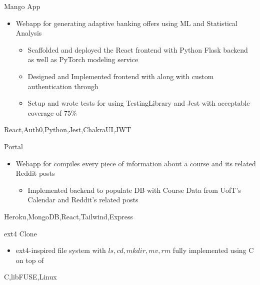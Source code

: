 %
%
%


\begin{projects}
	\project
	{Mango App}{ }
	{}
	{\begin{itemize}
        \setlength\itemsep{0.2em}
        \item{Webapp for generating adaptive banking offers using ML and Statistical Analysis}
        \begin{itemize}
            \setlength\itemsep{0.2em}
            \item{Scaffolded and deployed the React frontend with Python Flask backend as well as PyTorch modeling service}
            \item{Designed and Implemented frontend with  along with custom authentication through }
            \item{Setup and wrote tests for using TestingLibrary and Jest with acceptable coverage of 75\%}
        \end{itemize}   
      \end{itemize}
    }
	{React,Auth0,Python,Jest,ChakraUI,JWT}

	\project
	{Portal}{ }
	{ }
	{\begin{itemize}
        \setlength\itemsep{0.2em}
        \item{Webapp for compiles every piece of information about a course and its related Reddit posts}
        \begin{itemize}
            \item{Implemented backend to populate DB with Course Data from UofT's Calendar and Reddit's related posts}
        \end{itemize}   
      \end{itemize}
    }
    {Heroku,MongoDB,React,Tailwind,Express}

    \project
	{ext4 Clone}{ }
	{}
	{\begin{itemize}
        \item{ext4-inspired file system with $ls,cd,mkdir,mv,rm$ fully implemented using C on top of }
      \end{itemize}   
    }
	{C,libFUSE,Linux}
				


\end{projects}
